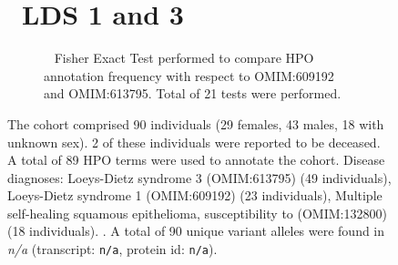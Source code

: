 \begin{figure}[htbp]
\section*{ LDS 1 and 3}
\centering
\begin{subfigure}[b]{0.95\textwidth}
\centering
{}
\captionsetup{justification=raggedright,singlelinecheck=false}
\caption{         Fisher Exact Test performed to compare HPO annotation frequency with respect to OMIM:609192 and OMIM:613795. Total of
        21 tests were performed. }
\end{subfigure}
\vspace{2em}
\caption{ The cohort comprised 90 individuals (29 females, 43 males, 18 with unknown sex). 2 of these individuals were reported to be deceased. A total of 89 HPO terms were used to annotate the cohort. Disease diagnoses: Loeys-Dietz syndrome 3 (OMIM:613795) (49 individuals), Loeys-Dietz syndrome 1 (OMIM:609192) (23 individuals), Multiple self-healing squamous epithelioma, susceptibility to (OMIM:132800) (18 individuals). . A total of 90 unique variant alleles were found in \textit{n/a} (transcript: \texttt{n/a}, protein id: \texttt{n/a}).}
\end{figure}

